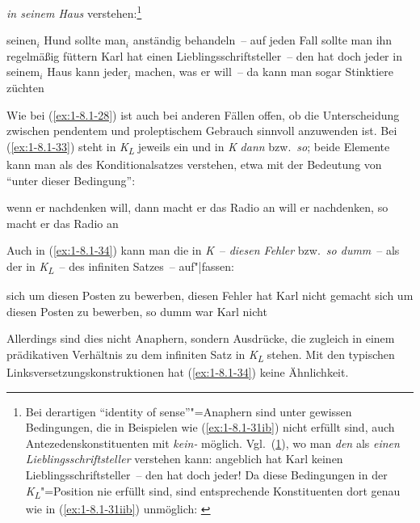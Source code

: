 \documentclass[output=paper]{langsci/langscibook}
\begin{document}
\textit{in seinem Haus} verstehen:\footnote{%
  Bei derartigen "`identity of sense"'"=Anaphern sind unter gewissen Bedingungen, die in Beispielen
  wie (\ref{ex:1-8.1-31ib}) nicht erfüllt sind, auch Antezedenskonstituenten mit \textit{kein-}
  möglich. Vgl.\ (\ref{ex:1-fn35i}), wo man \textit{den} als \textit{einen Lieblingsschriftsteller}
  verstehen kann:
  \ea
  \label{ex:1-fn35i}
  angeblich hat Karl keinen Lieblingsschriftsteller~-- den hat doch jeder!
  \z
  Da diese Bedingungen in der \textit{K\textsubscript{L}}"=Position nie erfüllt sind, sind entsprechende Konstituenten dort genau wie in (\ref{ex:1-8.1-31iib}) unmöglich:
  \eal
  \label{ex:1-fn35ii}
  \zllast%
}
\begin{exe}
\ex\label{ex:1-8.1-32}
\begin{xlist}
\ex\label{ex:1-8.1-32a} seinen$_i$ Hund sollte man$_i$ anständig behandeln~-- auf jeden Fall sollte man ihn regelmäßig füttern
\ex\label{ex:1-8.1-32b} Karl hat einen Lieblingsschriftsteller~-- den hat doch jeder
\ex\label{ex:1-8.1-32c} in seinem$_i$ Haus kann jeder$_i$ machen, was er will~-- da kann man sogar Stinktiere züchten
\end{xlist}
\end{exe}
Wie bei (\ref{ex:1-8.1-28}) ist auch bei anderen Fällen offen, ob die Unterscheidung zwischen pendentem und proleptischem Gebrauch sinnvoll anzuwenden ist. Bei (\ref{ex:1-8.1-33}) steht in \textit{K\textsubscript{L}} jeweils ein  und in \textit{K} \textit{dann} bzw.\ \textit{so}; beide Elemente kann man
als  des Konditionalsatzes verstehen, etwa mit der Bedeutung von "`unter
dieser Bedingung"':
\begin{exe}
\ex\label{ex:1-8.1-33}
\begin{xlist}
\ex\label{ex:1-8.1-33a} wenn er nachdenken will, dann macht er das Radio an
\ex\label{ex:1-8.1-33b} will er nachdenken, so macht er das Radio an
\end{xlist}
\end{exe}
 Auch in (\ref{ex:1-8.1-34}) kann man die  in \textit{K}~-- \textit{diesen Fehler} bzw.\ \textit{so dumm}~-- als  der  in \textit{K\textsubscript{L}}~-- des infiniten Satzes~-- auf"|fassen:
\begin{exe}
\ex\label{ex:1-8.1-34}
\begin{xlist}
\ex\label{ex:1-8.1-34a} sich um diesen Posten zu bewerben, diesen Fehler hat Karl nicht gemacht
\ex\label{ex:1-8.1-34b} sich um diesen Posten zu bewerben, so dumm war Karl nicht
\end{xlist}
\end{exe}
Allerdings sind dies nicht  Anaphern, sondern Ausdrücke, die zugleich in einem prädikativen Verhältnis zu dem infiniten Satz in \textit{K\textsubscript{L}} stehen. Mit den typischen
Linksversetzungskonstruktionen hat (\ref{ex:1-8.1-34}) keine Ähnlichkeit.
\end{document}
